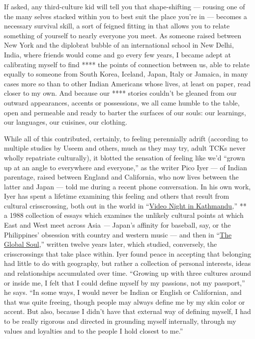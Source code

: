 If asked, any third-culture kid will tell you that shape-shifting ---
rousing one of the many selves stacked within you to best suit the place
you're in --- becomes a necessary survival skill, a sort of feigned
fitting in that allows you to relate something of yourself to nearly
everyone you meet. As someone raised between New York and the diplobrat
bubble of an international school in New Delhi, India, where friends
would come and go every few years, I became adept at calibrating myself
to find **** the points of connection between us, able to relate equally
to someone from South Korea, Iceland, Japan, Italy or Jamaica, in many
cases more so than to other Indian Americans whose lives, at least on
paper, read closer to my own. And because our **** stories couldn't be
gleaned from our outward appearances, accents or possessions, we all
came humble to the table, open and permeable and ready to barter the
surfaces of our souls: our learnings, our languages, our cuisines, our
clothing.

While all of this contributed, certainly, to feeling perennially adrift
(according to multiple studies by Useem and others, much as they may
try, adult TCKs never wholly repatriate culturally), it blotted the
sensation of feeling like we'd ``grown up at an angle to everywhere and
everyone,'' as the writer Pico Iyer --- of Indian parentage, raised
between England and California, who now lives between the latter and
Japan --- told me during a recent phone conversation. In his own work,
Iyer has spent a lifetime examining this feeling and others that result
from cultural crisscrossing, both out in the world in
``\href{https://archive.nytimes3xbfgragh.onion/www.nytimes3xbfgragh.onion/books/97/08/10/bookend/9026.html}{Video
Night in Kathmandu}\emph{,}'' ** a 1988 collection of essays which
examines the unlikely cultural points at which East and West meet across
Asia \emph{---} Japan's affinity for baseball, say, or the Philippines'
obsession with country and western music --- and then in
``\href{https://www.penguinrandomhouse.com/books/85777/the-global-soul-by-pico-iyer/}{The
Global Soul},'' written twelve years later, which studied, conversely,
the crisscrossings that take place within. Iyer found peace in accepting
that belonging had little to do with geography, but rather a collection
of personal interests, ideas and relationships accumulated over time.
``Growing up with three cultures around or inside me, I felt that I
could define myself by my passions, not my passport,'' he says. ``In
some ways, I would never be Indian or English or Californian, and that
was quite freeing, though people may always define me by my skin color
or accent. But also, because I didn't have that external way of defining
myself, I had to be really rigorous and directed in grounding myself
internally, through my values and loyalties and to the people I hold
closest to me.''

